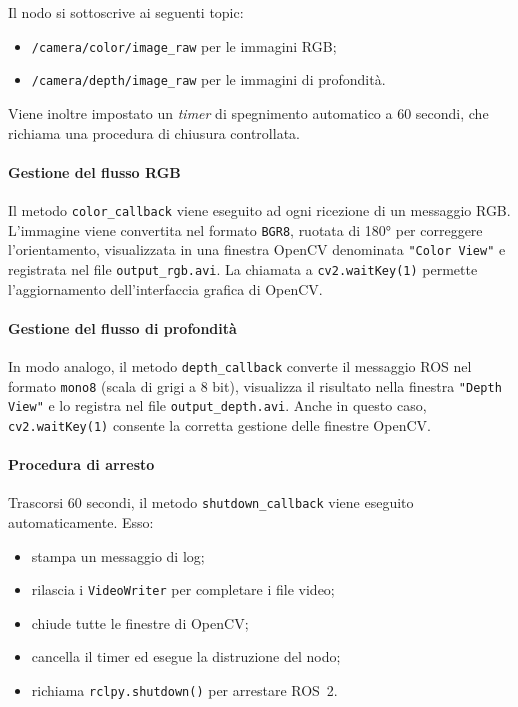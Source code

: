 \documentclass[11pt]{report}
\begin{document}
Il nodo si sottoscrive ai seguenti topic:
\begin{itemize}
  \item \texttt{/camera/color/image\_raw} per le immagini RGB;
  \item \texttt{/camera/depth/image\_raw} per le immagini di profondità.
\end{itemize}

Viene inoltre impostato un \textit{timer} di spegnimento automatico a 60 secondi, che richiama una procedura di chiusura controllata.

\paragraph{Gestione del flusso RGB}
Il metodo \texttt{color\_callback} viene eseguito ad ogni ricezione di un messaggio RGB. L’immagine viene convertita nel formato \texttt{BGR8}, ruotata di 180° per correggere l’orientamento, visualizzata in una finestra OpenCV denominata \texttt{"Color View"} e registrata nel file \texttt{output\_rgb.avi}. La chiamata a \texttt{cv2.waitKey(1)} permette l’aggiornamento dell’interfaccia grafica di OpenCV.

\paragraph{Gestione del flusso di profondità}
In modo analogo, il metodo \texttt{depth\_callback} converte il messaggio ROS nel formato \texttt{mono8} (scala di grigi a 8 bit), visualizza il risultato nella finestra \texttt{"Depth View"} e lo registra nel file \texttt{output\_depth.avi}. Anche in questo caso, \texttt{cv2.waitKey(1)} consente la corretta gestione delle finestre OpenCV.

\paragraph{Procedura di arresto}
Trascorsi 60 secondi, il metodo \texttt{shutdown\_callback} viene eseguito automaticamente. Esso:
\begin{itemize}
  \item stampa un messaggio di log;
  \item rilascia i \texttt{VideoWriter} per completare i file video;
  \item chiude tutte le finestre di OpenCV;
  \item cancella il timer ed esegue la distruzione del nodo;
  \item richiama \texttt{rclpy.shutdown()} per arrestare ROS~2.
\end{itemize}
\end{document}
